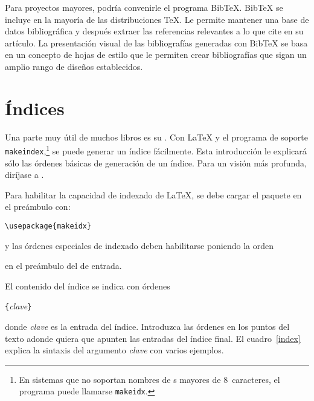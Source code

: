 \thispagestyle{fancyplain}

Para proyectos mayores, podría convenirle el programa Bib\TeX{}. Bib\TeX{} se incluye en la mayoría de las distribuciones \TeX{}.  Le permite mantener una base de datos bibliográfica y después extraer las referencias relevantes a lo que cite en su artículo.  La presentación visual de las bibliografías generadas con Bib\TeX{} se basa en un concepto de hojas de estilo que le permiten crear bibliografías que sigan un amplio rango de diseños establecidos.

\newpage

\section{Índices} \label{sec:indexing}

Una parte muy útil de muchos libros es su . Con \LaTeX{} y el programa de soporte \texttt{makeindex},\footnote{En sistemas que no soportan nombres de \filenomo{}s mayores de 8~caracteres, el programa puede llamarse \texttt{makeidx}.} se puede generar un índice fácilmente.  Esta introducción le explicará sólo las órdenes básicas de generación de un índice.  Para un visión más profunda, diríjase a \companion.   

Para habilitar la capacidad de indexado de \LaTeX{}, se debe cargar el paquete  en el preámbulo con:
\begin{lscommand}
\verb|\usepackage{makeidx}|
\end{lscommand}
y las órdenes especiales de indexado deben habilitarse poniendo la orden
\begin{lscommand}
\end{lscommand}
en el preámbulo del \filenomo{} de entrada.

El contenido del índice se indica con órdenes
\begin{lscommand}
  \verb|{|\emph{clave}\verb|}|
\end{lscommand}
donde \emph{clave} es la entrada del índice.  Introduzca las órdenes en los puntos del texto adonde quiera que apunten las entradas del índice final.  El cuadro~\ref{index} explica la sintaxis del argumento \emph{clave} con varios ejemplos.

